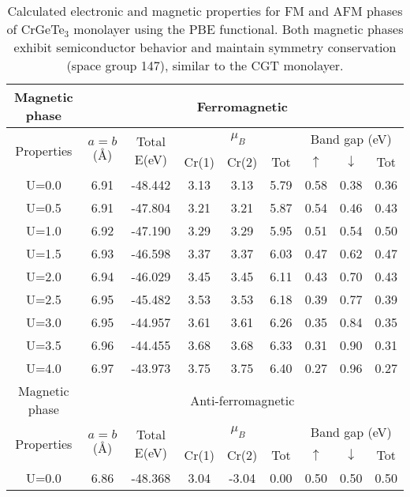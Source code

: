 \begin{table}[H]
	\centering
	\setlength{\extrarowheight}{0.5ex}
	\caption{Calculated electronic and magnetic properties for FM and AFM phases of CrGeTe$_3$ monolayer using the PBE functional. Both magnetic phases exhibit semiconductor behavior and maintain symmetry conservation (space group 147), similar to the CGT monolayer.}
	\begin{tabular}{cccccc|ccc}
		\toprule
		\toprule
		\rowcolor{WhiteSmoke!70!Lavender}
		Magnetic phase & \multicolumn{8}{c}{Ferromagnetic} \\
		\midrule
		\multirow{2}{*}{Properties} & \multirow{2}{*}{$a=b$(\AA)}& \multirow{2}{*}{Total E(eV)} & \multicolumn{3}{c}{$\mu_{B}$} & \multicolumn{3}{c}{Band gap (eV)}  \\
		\cline{4-9}
		& & & Cr(1)& Cr(2) & Tot  & $\uparrow$ & $\downarrow$ &  Tot \\
		\midrule
		U=0.0 & 6.91 & -48.442 & 3.13 & 3.13 & 5.79 & 0.58 & 0.38 & 0.36 \\
		U=0.5 & 6.91 & -47.804 & 3.21 & 3.21 & 5.87 & 0.54 & 0.46 & 0.43 \\
		U=1.0 & 6.92 & -47.190 & 3.29 & 3.29 & 5.95 & 0.51 & 0.54 & 0.50 \\
		U=1.5 & 6.93 & -46.598 & 3.37 & 3.37 & 6.03 & 0.47 & 0.62 & 0.47 \\
		U=2.0 & 6.94 & -46.029 & 3.45 & 3.45 & 6.11 & 0.43 & 0.70 & 0.43 \\
		U=2.5 & 6.95 & -45.482 & 3.53 & 3.53 & 6.18 & 0.39 & 0.77 & 0.39 \\
		U=3.0 & 6.95 & -44.957 & 3.61 & 3.61 & 6.26 & 0.35 & 0.84 & 0.35 \\
		U=3.5 & 6.96 & -44.455 & 3.68 & 3.68 & 6.33 & 0.31 & 0.90 & 0.31 \\
		U=4.0 & 6.97 & -43.973 & 3.75 & 3.75 & 6.40 & 0.27 & 0.96 & 0.27 \\
		\midrule
		\rowcolor{WhiteSmoke!70!Lavender}
		Magnetic phase & \multicolumn{8}{c}{Anti-ferromagnetic} \\
		\midrule
		\multirow{2}{*}{Properties} & \multirow{2}{*}{$a=b$(\AA)}& \multirow{2}{*}{Total E(eV)} & \multicolumn{3}{c}{$\mu_{B}$} & \multicolumn{3}{c}{Band gap (eV)}  \\
		\cline{4-9}
		& & & Cr(1)& Cr(2) & Tot  & $\uparrow$ & $\downarrow$ &  Tot \\
		\midrule
		U=0.0 & 6.86 & -48.368 & 3.04 & -3.04 & 0.00 & 0.50 & 0.50 & 0.50 \\

\end{tabular}
\end{table}
